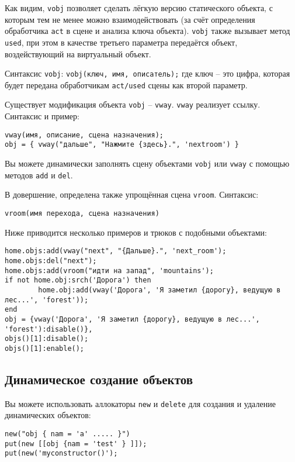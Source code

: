 \documentclass[a4paper,12pt]{article}
\begin{document}
Как видим, \verb/vobj/ позволяет сделать лёгкую версию статического объекта, с которым тем не менее можно взаимодействовать (за счёт определения обработчика \verb/act/ в сцене и анализа ключа объекта). \verb/vobj/ также вызывает метод \verb/used/, при этом в качестве третьего параметра передаётся объект, воздействующий на виртуальный объект.

Синтаксис \verb/vobj/: \verb/vobj(ключ, имя, описатель);/ где ключ -- это цифра, которая будет передана обработчикам \verb.act/used. сцены как второй параметр.

Существует модификация объекта \verb/vobj/ -- \verb/vway/. \verb/vway/ реализует ссылку. Синтаксис и пример:

\begin{verbatim}
vway(имя, описание, сцена назначения);
obj = { vway("дальше", "Нажмите {здесь}.", 'nextroom') }
\end{verbatim}

Вы можете динамически заполнять сцену объектами \verb/vobj/ или \verb/vway/ с помощью методов \verb/add/ и \verb/del/.

В довершение, определена также упрощённая сцена \verb/vroom/. Синтаксис:

\begin{verbatim}
vroom(имя перехода, сцена назначения)
\end{verbatim}

Ниже приводится несколько примеров и трюков с подобными объектами:

\begin{verbatim}
home.objs:add(vway("next", "{Дальше}.", 'next_room');
home.objs:del("next");
home.objs:add(vroom("идти на запад", 'mountains');
if not home.obj:srch('Дорога') then
        home.obj:add(vway('Дорога', 'Я заметил {дорогу}, ведущую в лес...', 'forest'));
end
obj = {vway('Дорога', 'Я заметил {дорогу}, ведущую в лес...', 'forest'):disable()},
objs()[1]:disable();
objs()[1]:enable();
\end{verbatim}

\subsection{Динамическое создание объектов}

Вы можете использовать аллокаторы \verb/new/ и \verb/delete/ для создания и удаление динамических объектов:

\begin{verbatim}
new("obj { nam = 'a' ..... }")
put(new [[obj {nam = 'test' } ]]);
put(new('myconstructor()');
\end{verbatim}
\end{document}

